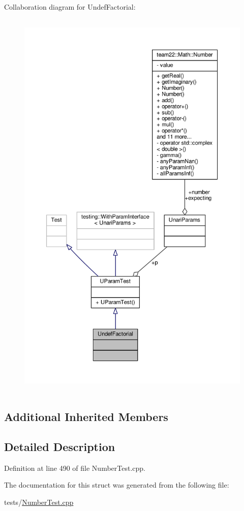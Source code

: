 Collaboration diagram for Undef\+Factorial\+:
\nopagebreak
\begin{figure}[H]
\begin{center}
\leavevmode
\includegraphics[height=550pt]{struct_undef_factorial__coll__graph}
\end{center}
\end{figure}
\subsection*{Additional Inherited Members}


\subsection{Detailed Description}


Definition at line 490 of file Number\+Test.\+cpp.



The documentation for this struct was generated from the following file\+:\begin{DoxyCompactItemize}
\item 
tests/\hyperlink{_number_test_8cpp}{Number\+Test.\+cpp}\end{DoxyCompactItemize}
